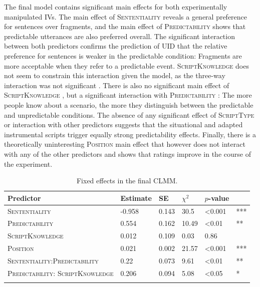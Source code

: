 The final model contains significant main effects for both experimentally manipulated IVs. The main effect of \textsc{Sententiality}  reveals a general preference for sentences over fragments, and the main effect of \textsc{Predictability}  shows that predictable utterances are also preferred overall. The significant interaction  between both predictors confirms the prediction of UID that the relative preference for sentences is weaker in the predictable condition: Fragments are more acceptable when they refer to a predictable event. \textsc{ScriptKnowledge} does not seem to constrain this interaction given the model, as the three-way interaction was not significant . There is also no significant main effect of \textsc{ScriptKnowledge} , but a significant interaction with \textsc{Predictability} : The more people know about a scenario, the more they distinguish between the predictable and unpredictable conditions. The absence of any significant effect of \textsc{ScriptType} or interaction with other predictors suggests that the situational and adapted instrumental scripts trigger equally strong predictability effects. Finally, there is a theoretically uninteresting \textsc{Position} main effect that however does not interact with any of the other predictors and shows that ratings improve in the course of the experiment.

\begin{table}[t]
\centering
\caption{Fixed effects in the final CLMM. \label{tab:scripts-rating-estimates}}
\begin{tabular}{p{3.4cm}lllll}
\lsptoprule
Predictor & Estimate & SE & $\chi^2$ &  $p$-value &  \\   
\midrule
\textsc{Sententiality}      &  -0.958 & 0.143 & 30.5 & \textless 0.001 & ***\\
\textsc{Predictability}    &   \phantom{-}0.554 &  0.162 & 10.49 & \textless 0.01 & ** \\
\textsc{ScriptKnowledge}    &  \phantom{-}0.012 &  0.109 & \phantom{1}0.03 & \phantom{\textless }0.86  &  \\
\textsc{Position}   & \phantom{-}0.021 & 0.002 & 21.57 & \textless 0.001 & *** \\
\textsc{Sententiality:}\linebreak \textsc{Predictability} &   \phantom{-}0.22 &  0.073  & \phantom{-}9.61 & \textless 0.01 & **\\
\textsc{Predictability:} \textsc{ScriptKnowledge}   &  \phantom{-}0.206 & 0.094 & \phantom{1}5.08  & \textless 0.05 & *\\
\lspbottomrule
\end{tabular}
\end{table}


